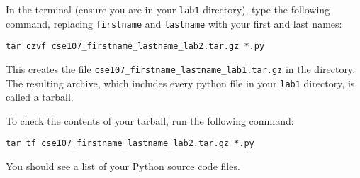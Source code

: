\documentclass[12pt,hidelinks]{article}
\begin{document}
In the terminal (ensure you are in your \texttt{lab1} directory), type the following command, replacing \texttt{firstname} and \texttt{lastname} with your first and last names:

\begin{lstlisting}[style=bash]
tar czvf cse107_firstname_lastname_lab2.tar.gz *.py
\end{lstlisting}

This creates the file \texttt{cse107\_firstname\_lastname\_lab1.tar.gz} in the directory. The resulting archive, which includes every python file in your \texttt{lab1} directory, is called a tarball. 

To check the contents of your tarball, run the following command:

\begin{lstlisting}[style=bash]
tar tf cse107_firstname_lastname_lab2.tar.gz *.py
\end{lstlisting}

You should see a list of your Python source code files.
\end{document}
